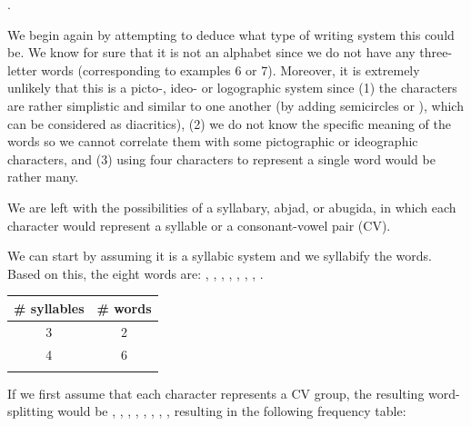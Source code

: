 \begin{refsection}
\begin{problem}{\langnameTagbanwa}{\nameVNeacsu}{}
\begin{tblsWarning} 
.
\end{tblsWarning}
\end{problem}

\begin{mysolution}
We begin again by attempting to deduce what type of writing system this could be. We know for sure that it is not an alphabet since we do not have any three-letter words (corresponding to examples 6 or 7). Moreover, it is extremely unlikely that this is a picto-, ideo- or logographic system since (1) the characters are rather simplistic and similar to one another (by adding semicircles  or ), which can be considered as diacritics), (2) we do not know the specific meaning of the words so we cannot correlate them with some pictographic or ideographic characters, and (3) using four characters to represent a single word would be rather many.

We are left with the possibilities of a syllabary, abjad, or abugida, in which each character would represent a syllable or a consonant-vowel pair (CV).

We can start by assuming it is a syllabic system and we syllabify the words. Based on this, the eight words are: , , , , , , , .


\begin{table}[H]
\begin{tabular}{cc}
\lsptoprule
\#   syllables & \#   words  \\ \midrule
3 & 2  \\ 
4 & 6  \\
\lspbottomrule
\end{tabular}
\end{table}

If we first assume that each character represents a CV group, the resulting word-splitting would be , , , , , , , , resulting in the following frequency table:


\end{mysolution}
\end{refsection}
